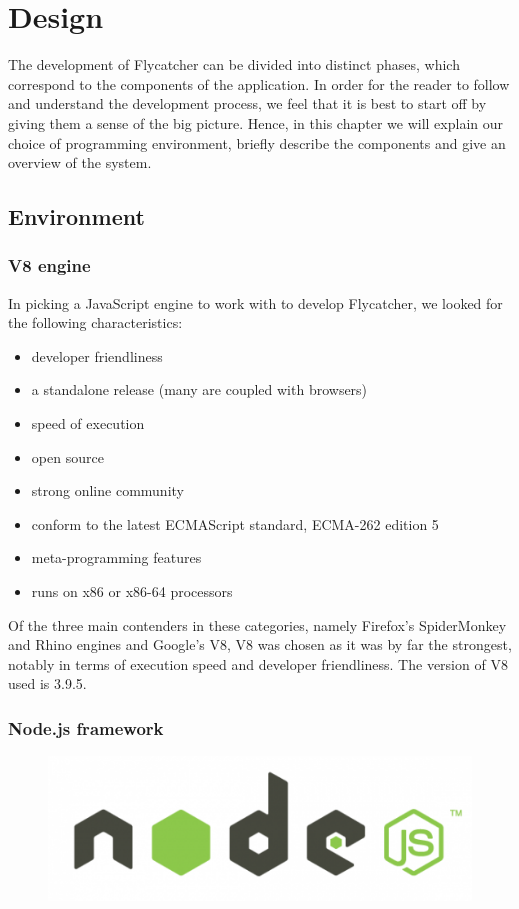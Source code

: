 \chapter{Design}
The development of Flycatcher can be divided into distinct phases, which correspond to the components of the application. In order for the reader to follow and understand the development process, we feel that it is best to start off by giving them a sense of the big picture. Hence, in this chapter we will explain our choice of programming environment, briefly describe the components and give an overview of the system.

\section{Environment}
\subsection{V8 engine}

In picking a JavaScript engine to work with to develop \textsf{Flycatcher}, we looked for the following characteristics:
\begin{itemize}
   \item developer friendliness
   \item a standalone release (many are coupled with browsers)
   \item speed of execution
   \item open source
   \item strong online community
   \item conform to the latest ECMAScript standard, ECMA-262 edition 5
   \item meta-programming features
   \item runs on x86 or x86-64 processors
\end{itemize}

Of the three main contenders in these categories, namely Firefox's SpiderMonkey and Rhino engines and Google's V8, V8 was chosen as it was by far the strongest, notably in terms of execution speed and developer friendliness. The version of V8 used is 3.9.5.

\subsection{Node.js framework}
\begin{figure}[h]
\centering
\includegraphics[scale=0.2]{./components/chapter3/nodejs.png}
\end{figure}

